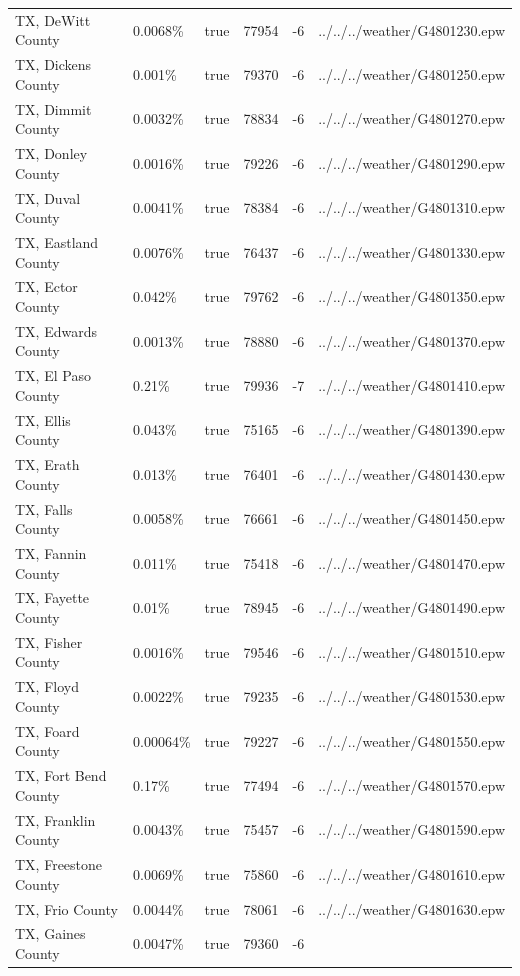 \begin{longtable}[]{@{}llllll@{}}
TX, DeWitt County & 0.0068\% & true & 77954 & -6 &
../../../weather/G4801230.epw \\
TX, Dickens County & 0.001\% & true & 79370 & -6 &
../../../weather/G4801250.epw \\
TX, Dimmit County & 0.0032\% & true & 78834 & -6 &
../../../weather/G4801270.epw \\
TX, Donley County & 0.0016\% & true & 79226 & -6 &
../../../weather/G4801290.epw \\
TX, Duval County & 0.0041\% & true & 78384 & -6 &
../../../weather/G4801310.epw \\
TX, Eastland County & 0.0076\% & true & 76437 & -6 &
../../../weather/G4801330.epw \\
TX, Ector County & 0.042\% & true & 79762 & -6 &
../../../weather/G4801350.epw \\
TX, Edwards County & 0.0013\% & true & 78880 & -6 &
../../../weather/G4801370.epw \\
TX, El Paso County & 0.21\% & true & 79936 & -7 &
../../../weather/G4801410.epw \\
TX, Ellis County & 0.043\% & true & 75165 & -6 &
../../../weather/G4801390.epw \\
TX, Erath County & 0.013\% & true & 76401 & -6 &
../../../weather/G4801430.epw \\
TX, Falls County & 0.0058\% & true & 76661 & -6 &
../../../weather/G4801450.epw \\
TX, Fannin County & 0.011\% & true & 75418 & -6 &
../../../weather/G4801470.epw \\
TX, Fayette County & 0.01\% & true & 78945 & -6 &
../../../weather/G4801490.epw \\
TX, Fisher County & 0.0016\% & true & 79546 & -6 &
../../../weather/G4801510.epw \\
TX, Floyd County & 0.0022\% & true & 79235 & -6 &
../../../weather/G4801530.epw \\
TX, Foard County & 0.00064\% & true & 79227 & -6 &
../../../weather/G4801550.epw \\
TX, Fort Bend County & 0.17\% & true & 77494 & -6 &
../../../weather/G4801570.epw \\
TX, Franklin County & 0.0043\% & true & 75457 & -6 &
../../../weather/G4801590.epw \\
TX, Freestone County & 0.0069\% & true & 75860 & -6 &
../../../weather/G4801610.epw \\
TX, Frio County & 0.0044\% & true & 78061 & -6 &
../../../weather/G4801630.epw \\
TX, Gaines County & 0.0047\% & true & 79360 & -6 &

\end{longtable}
